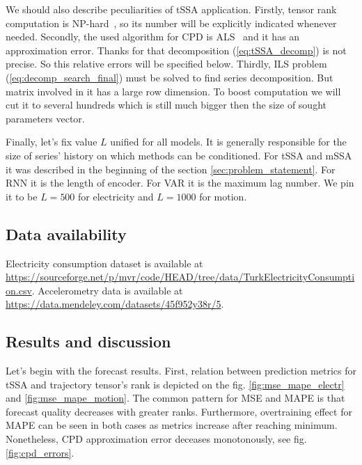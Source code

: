 \documentclass[referee, pdflatex, sn-mathphys-num]{sn-jnl}
\theoremstyle{definition}
\theoremstyle{plain}
\begin{document}
	We should also describe peculiarities of tSSA application. Firstly, tensor rank computation is NP-hard~\cite{HASTAD1990644}, so its number will be explicitly indicated whenever needed. Secondly, the used algorithm for CPD is ALS~\cite{kolda_tensors} and it has an approximation error. Thanks for that decomposition (\ref{eq:tSSA_decomp}) is not precise. So this relative errors will be specified below. Thirdly, ILS problem (\ref{eq:decomp_search_final}) must be solved to find series decomposition. But matrix involved in it has a large row dimension. To boost computation we will cut it to several hundreds which is still much bigger then the size of sought parameters vector.

	Finally, let's fix value $ L $ unified for all models. It is generally responsible for the size of series' history on which methods can be conditioned. For tSSA and mSSA it was described in the beginning of the section \ref{sec:problem_statement}. For RNN it is the length of encoder. For VAR it is the maximum lag number. We pin it to be $ L = 500 $ for electricity and $ L = 1000 $ for motion.
	
	\subsection{Data availability}
	
	Electricity consumption dataset is available at \url{https://sourceforge.net/p/mvr/code/HEAD/tree/data/TurkElectricityConsumption.csv}. Accelerometry data is available at \url{https://data.mendeley.com/datasets/45f952y38r/5}.
	
	\subsection{Results and discussion}
	
	Let's begin with the forecast results. First, relation between prediction metrics for tSSA and trajectory tensor's rank is depicted on the fig. \ref{fig:mse_mape_electr} and \ref{fig:mse_mape_motion}. The common pattern for MSE and MAPE is that forecast quality decreases with greater ranks. Furthermore, overtraining effect for MAPE can be seen in both cases as metrics increase after reaching minimum. Nonetheless, CPD approximation error deceases monotonously, see fig. \ref{fig:cpd_errors}.
	
\end{document}
